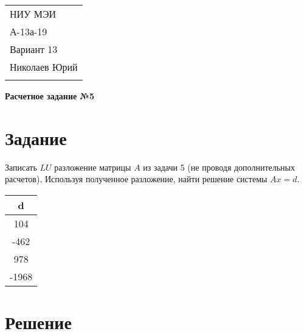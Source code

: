 \documentclass[a4paper,12pt]{article} %
\begin{document}
\thispagestyle{empty} 

\begin{tabular}{p{15.5cm}} 
НИУ МЭИ \\ А-13а-19  \\ Вариант 13 \\ Николаев Юрий\\
\hline 
\\
\end{tabular} 

\vspace*{0.3cm}

\begin{center} 
	{\Large \bf Расчетное задание №5} 
	\vspace{2mm}
\end{center}  



\section{Задание}
Записать $LU$ разложение матрицы $A$ из задачи 5 (не проводя дополнительных расчетов). Используя полученное разложение, найти решение системы $Ax = d$.

\begin{center}
\begin{tabular}{| c |}
\hline
d \\ \hline 
104 \\
-462 \\
978 \\
-1968 \\
\hline
\end{tabular}
\end{center}

\section{Решение}
\end{document}
